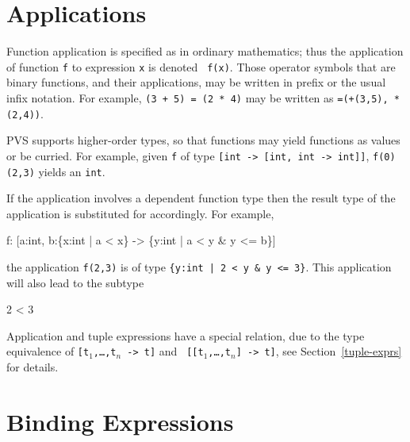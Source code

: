 \section{Applications}

Function application is specified as in ordinary mathematics; thus the
application of function \texttt{f} to expression \texttt{x} is denoted \texttt{
f(x)}.  Those operator symbols that are binary functions, and their
applications, may be written in prefix or the usual infix notation.  For
example, \texttt{(3 + 5) = (2 * 4)} may be written as \texttt{=(+(3,5),
*(2,4))}.

PVS supports higher-order types, so that functions may yield functions
as values or be curried.  For example, given
\texttt{f} of type \texttt{[int -> [int, int -> int]]}, \texttt{f(0)(2,3)}
yields an \texttt{int}.

If the application involves a dependent function type then the result
type of the application is substituted for accordingly.  For example,
\begin{pvsex}
  f: [a:int, b:\{x:int | a < x\} -> \{y:int | a < y & y <= b\}]
\end{pvsex}
the application \texttt{f(2,3)} is of type \texttt{\{y:int | 2 < y \& y <=
3\}}.  This application will also lead to the subtype \tcc
\begin{pvsex}
  2 < 3
\end{pvsex}

Application and tuple expressions have a special relation, due to the
type equivalence of \texttt{[t$_1$,\ldots,t$_n$ -> t]} and \texttt{
[[t$_1$,\ldots,t$_n$] -> t]}, see Section~\ref{tuple-exprs} for details.

\section{Binding Expressions}\label{binding-expressions}

